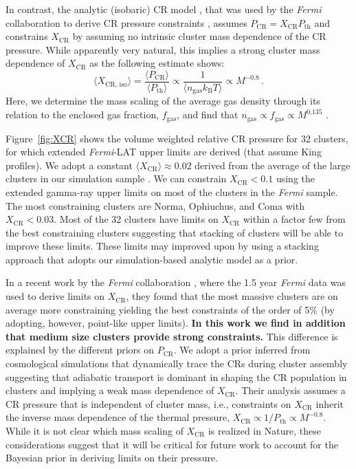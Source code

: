 \documentclass[10pt,aps,pra,reprint,amsmath,amsfonts,amssymb,showpacs,nofootinbib,floatfix]{revtex4-1}
\def\C#1{{\bf #1}}
\newcommand{\Fermi}{{\em Fermi}\xspace}
\newcommand{\rmn}{\mathrm}
\newcommand{\B}{\rmn{B}}
\newcommand{\bra}{\langle}
\newcommand{\ket}{\rangle}
\newcommand{\CR}{\rmn{CR}}
\begin{document}
In contrast, the analytic (isobaric) CR model
\cite{2004A&A...413...17P}, that was used by the \Fermi collaboration
to derive CR pressure constraints \cite{2010ApJ...717L..71A}, assumes
$P_\CR = X_\CR P_\rmn{th}$ and constrains $X_\CR$ by assuming no
intrinsic cluster mass dependence of the CR pressure.  While
apparently very natural, this implies a strong cluster mass dependence
of $X_\CR$ as the following estimate shows:
\begin{equation}
    \bra X_{\CR,\,\rmn{iso}}\ket = \frac{\bra P_\CR\ket}{\bra P_\rmn{th}\ket} 
    \propto \frac{1}{\bra n_\rmn{gas} k_\B T\ket} \propto M^{-0.8}\,.
\end{equation}
Here, we determine the mass scaling of the average gas density through
its relation to the enclosed gas fraction, $f_\rmn{gas}$, and find
that $n_\rmn{gas}\propto f_\rmn{gas} \propto M^{0.135}$
\cite{2009ApJ...693.1142S}.

Figure~\ref{fig:XCR} shows the volume weighted relative CR pressure
for 32 clusters, for which extended \Fermi-LAT upper limits are
derived (that assume King profiles). We adopt a constant $\bra
X_\CR\ket\approx 0.02$ derived from the average of the large clusters
in our simulation sample \cite{2008MNRAS.385.1211P,
  2010MNRAS.409..449P}. We can constrain $X_\CR < 0.1$ using the
extended gamma-ray upper limits on most of the clusters in the \Fermi
sample. The most constraining clusters are Norma, Ophiuchus, and Coma
with $X_\CR < 0.03$. Most of the 32 clusters have limits on $X_\CR$
within a factor few from the best constraining clusters suggesting
that stacking of clusters will be able to improve these limits.  These
limits may improved upon by using a stacking approach that adopts our
simulation-based analytic model as a prior.

In a recent work by the \Fermi collaboration
\cite{2010ApJ...717L..71A}, where the 1.5 year \Fermi data was used to
derive limits on $X_\CR$, they found that the most massive clusters
are on average more constraining yielding the best constraints of the
order of 5\% (by adopting, however, point-like upper limits). \C{In
  this work we find in addition that medium size clusters provide
  strong constraints.}  This difference is explained by the different
priors on $P_\CR$.  We adopt a prior inferred from cosmological
simulations that dynamically trace the CRs during cluster assembly
suggesting that adiabatic transport is dominant in shaping the CR
population in clusters and implying a weak mass dependence of
$X_\CR$. Their analysis assumes a CR pressure that is independent of
cluster mass, i.e., constraints on $X_\CR$ inherit the inverse mass
dependence of the thermal pressure, $X_\CR\propto 1/P_\rmn{th}\propto
M^{-0.8}$. While it is not clear which mass scaling of $X_\CR$ is
realized in Nature, these considerations suggest that it will be
critical for future work to account for the Bayesian prior in deriving
limits on their pressure.
\end{document}

